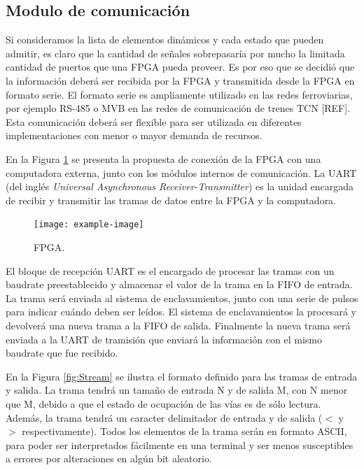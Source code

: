 \subsection{Modulo de comunicación}

	Si consideramos la lista de elementos dinámicos y cada estado que pueden admitir, es claro que la cantidad de señales sobrepasaría por mucho la limitada cantidad de puertos que una FPGA pueda proveer. Es por eso que se decidió que la información deberá ser recibida por la FPGA y transmitida desde la FPGA en formato serie. El formato serie es ampliamente utilizado en las redes ferroviarias, por ejemplo RS-485 o MVB en las redes de comunicación de trenes  TCN [REF]. Esta comunicación deberá ser flexible para ser utilizada en diferentes implementaciones con menor o mayor demanda de recursos.
	
	En la Figura \ref{fig:GeneralCom} se presenta la propuesta de conexión de la FPGA con una computadora externa, junto con los módulos internos de comunicación.	La UART (del inglés \textit{Universal Asynchronous Receiver-Transmitter}) es la unidad encargada de recibir y transmitir las tramas de datos entre la FPGA y la computadora.
	
	\begin{figure}[H]
		\centering
		\texttt{[image: example-image]}
		\centering\caption{FPGA.}
		\label{fig:GeneralCom}
	\end{figure}
	
	El bloque de recepción UART es el encargado de procesar las tramas con un baudrate preestablecido y almacenar el valor de la trama en la FIFO de entrada. La trama será enviada al sistema de enclavamientos, junto con una serie de pulsos para indicar cuándo deben ser leídos. El sistema de enclavamientos la procesará y devolverá una nueva trama a la FIFO de salida. Finalmente la nueva trama será enviada a la UART de tramisión que enviará la información con el mismo baudrate que fue recibido.
		
	En la Figura \ref{fig:Stream} se ilustra el formato definido para las tramas de entrada y salida. La trama tendrá un tamaño de entrada N y de salida M, con N menor que M, debido a que el estado de ocupación de las vías es de sólo lectura. Además, la trama tendrá un caracter delimitador de entrada y de salida ($<$ y $>$ respectivamente). Todos los elementos de la trama serán en formato ASCII, para poder ser interpretados fácilmente en una terminal y ser menos susceptibles a errores por alteraciones en algún bit aleatorio.
	
